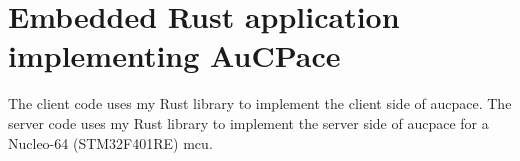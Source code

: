 \chapter{Embedded Rust application implementing AuCPace}
\label{chap:appendix-aucpace-embedded}

The client code uses my Rust library to implement the client side of \gls{aucpace}.
The server code uses my Rust library to implement the server side of \gls{aucpace} for a Nucleo-64 (STM32F401RE) \gls{mcu}.


